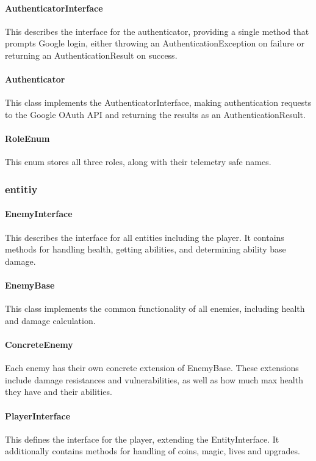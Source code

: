 \documentclass[11pt]{article}
\begin{document}
\paragraph{AuthenticatorInterface}
This describes the interface for the authenticator, providing a single method that prompts Google login, either throwing an AuthenticationException on failure or returning an AuthenticationResult on success.

\paragraph{Authenticator}
This class implements the AuthenticatorInterface, making authentication requests to the Google OAuth API and returning the results as an AuthenticationResult. 

\paragraph{RoleEnum}
This enum stores all three roles, along with their telemetry safe names.

\subsubsection{entitiy}

\paragraph{EnemyInterface}
This describes the interface for all entities including the player. It contains methods for handling health, getting abilities, and determining ability base damage. 

\paragraph{EnemyBase}
This class implements the common functionality of all enemies, including health and damage calculation. 

\paragraph{ConcreteEnemy}
Each enemy has their own concrete extension of EnemyBase. These extensions include damage resistances and vulnerabilities, as well as how much max health they have and their abilities. 

\paragraph{PlayerInterface}
This defines the interface for the player, extending the EntityInterface. It additionally contains methods for handling of coins, magic, lives and upgrades. 
\end{document}
